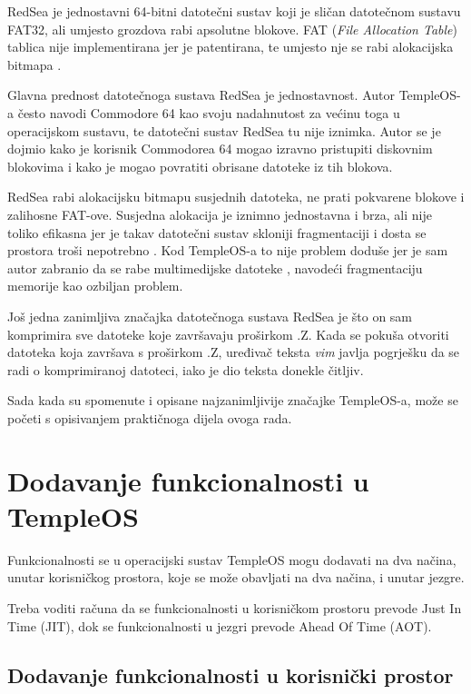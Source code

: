 \documentclass{foi}
\begin{document}
RedSea je jednostavni 64-bitni datotečni sustav koji je sličan datotečnom sustavu FAT32, ali umjesto grozdova rabi apsolutne blokove. FAT (\emph{File Allocation Table}) tablica nije implementirana jer je patentirana, te umjesto nje se rabi alokacijska bitmapa \cite{RedSea}.

Glavna prednost datotečnoga sustava RedSea je jednostavnost. Autor TempleOS-a često navodi Commodore 64 kao svoju nadahnutost za većinu toga u operacijskom sustavu, te datotečni sustav RedSea tu nije iznimka. Autor se je dojmio kako je korisnik Commodorea 64 mogao izravno pristupiti diskovnim blokovima i kako je mogao povratiti obrisane datoteke iz tih blokova.

RedSea rabi alokacijsku bitmapu susjednih datoteka, ne prati pokvarene blokove i zalihosne FAT-ove. Susjedna alokacija je iznimno jednostavna i brza, ali nije toliko efikasna jer je takav datotečni sustav skloniji fragmentaciji i dosta se prostora troši nepotrebno \cite{tannenbaum1997}. Kod TempleOS-a to nije problem doduše jer je sam autor zabranio da se rabe multimedijske datoteke \cite{BlockChain} \cite{RedSeaReliablility}, navodeći fragmentaciju memorije kao ozbiljan problem.

Još jedna zanimljiva značajka datotečnoga sustava RedSea je što on sam komprimira sve datoteke koje završavaju proširkom {\selectfont .Z}. \cite{BlockChain} Kada se pokuša otvoriti datoteka koja završava s proširkom {\selectfont .Z}, uređivač teksta \emph{vim} javlja pogrješku da se radi o komprimiranoj datoteci, iako je dio teksta donekle čitljiv.

Sada kada su spomenute i opisane najzanimljivije značajke TempleOS-a, može se početi s opisivanjem praktičnoga dijela ovoga rada.

\chapter{Dodavanje funkcionalnosti u TempleOS}

Funkcionalnosti se u operacijski sustav TempleOS mogu dodavati na dva načina, unutar korisničkog prostora, koje se može obavljati na dva načina, i unutar jezgre.

Treba voditi računa da se funkcionalnosti u korisničkom prostoru prevode Just In Time (JIT), dok se funkcionalnosti u jezgri prevode Ahead Of Time (AOT).

\section{Dodavanje funkcionalnosti u korisnički prostor}
\end{document}
